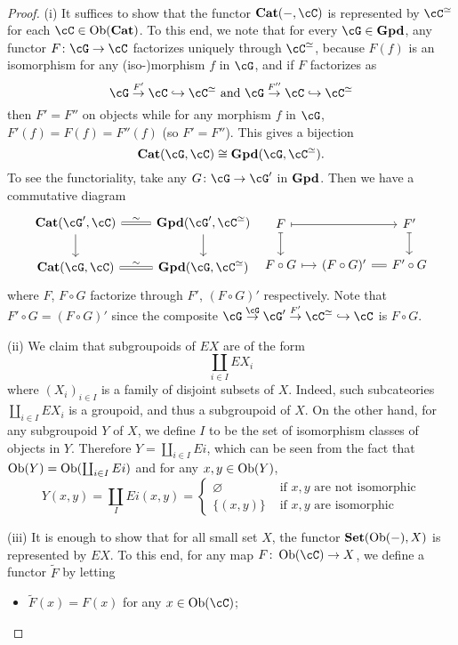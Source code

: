 \documentclass[a4paper,11pt,openany]{scrartcl}
\begin{document}
~\\
\begin{proof}


(i) It suffices to show that the functor $\Cat(-,\cC)$ is represented by $\cC^\simeq$ for each $\cC\in\Ob(\Cat)$. To this end, we note that for every $\cG\in\Gpd$, any functor $F\colon\cG\to\cC$ factorizes uniquely through $\cC^\simeq$, because $F(f)$ is an isomorphism for any (iso-)morphism $f$ in $\cG$, and if $F$ factorizes as 
\[
\cG\overset{F'}{\to}\cC\hookrightarrow\cC^\simeq\text{ and }\cG\overset{F''}{\to}\cC\hookrightarrow\cC^\simeq
\]
then $F'=F''$ on objects while for any morphism $f$ in $\cG$, $F'(f)=F(f)=F''(f)$ (so $F'=F''$). This gives a bijection
\[
\Cat(\cG,\cC)\cong\Gpd(\cG,\cC^\simeq).
\]
To see the functoriality, take any $G\colon\cG\to\cG'$ in $\operatorname{\mathbf{Gpd}}$. Then we have a commutative diagram
\[
\begin{tikzcd}
\Cat(\cG',\cC)\arrow[r,equal,"\sim"]\arrow[d]& \Gpd(\cG',\cC^\simeq)\arrow[d]\\
\Cat(\cG,\cC)\arrow[r,equal,"\sim"]& \Gpd(\cG,\cC^\simeq)
\end{tikzcd}
\ 
\begin{tikzcd}[column sep=small]
F\arrow[rr,mapsto]\arrow[d,mapsto]&& F'\arrow[d,mapsto]\\
F\circ G\arrow[r,mapsto]& (F\circ G)'\arrow[r,equal]& F'\circ G
\end{tikzcd}
\]
where $F$, $F\circ G$ factorize through $F'$, $(F\circ G)'$ respectively. Note that $F'\circ G=(F\circ G)'$ since the composite $\cG\overset{\cG}{\to}\cG'\overset{F'}{\to}\cC^\simeq\hookrightarrow\cC$ is $F\circ G$.

(ii) We claim that subgroupoids of $EX$ are of the form
\[
\coprod_{i\in I}EX_i
\]
where $(X_i)_{i\in I}$ is a family of disjoint subsets of $X$. Indeed, such subcateories $\coprod_{i\in I}EX_i$ is a groupoid, and thus a subgroupoid of $X$. On the other hand, for any subgroupoid $Y$ of $X$, we define $I$ to be the set of isomorphism classes of objects in $Y$. Therefore $Y=\coprod_{i\in I}Ei$, which can be seen from the fact that $\operatorname{Ob}(Y)=\operatorname{Ob}(\coprod_{i\in I}Ei)$ and for any $x,y\in\operatorname{Ob}(Y)$, 
\[
Y(x,y)=\coprod_IEi(x,y)=\left\{\begin{array}{ll}
\varnothing& \text{ if $x,y$ are not isomorphic}\\
\{(x,y)\}&\text{ if $x,y$ are isomorphic}
\end{array}\right.
\]

(iii) It is enough to show that for all small set $X$, the functor $\operatorname{\mathbf{Set}}(\operatorname{Ob}(-),X)$ is represented by $EX$. To this end, for any map $F\colon\Ob(\cC)\to X$, we define a functor $\widetilde{F}$ by letting
\begin{itemize}
\item $\widetilde{F}(x)=F(x)$ for any $x\in\Ob(\cC)$;


\end{itemize}
\end{proof}
\end{document}
